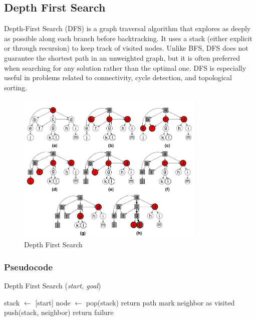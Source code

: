 \subsection{Depth First Search}
\noindent Depth-First Search (DFS) is a graph traversal algorithm that explores as deeply as possible along each branch before backtracking. It uses a stack (either explicit or through recursion) to keep track of visited nodes. Unlike BFS, DFS does not guarantee the shortest path in an unweighted graph, but it is often preferred when searching for any solution rather than the optimal one. DFS is especially useful in problems related to connectivity, cycle detection, and topological sorting.

\begin{figure}[H]
	\centering
	\includegraphics[width=0.8\textwidth]{./imgs/dfs.png}
	\caption{Depth First Search}
\end{figure}

\subsubsection{Pseudocode}
\begin{algorithm}[H]
	\caption{Depth First Search (\textit{start, goal})}\label{alg:dfs}
	\begin{algorithmic}[1]
		\State stack \(\gets\) [start]
		\State node \(\gets\) pop(stack)
		\State return path
		\EndIf
		\State mark neighbor as visited
		\State push(stack, neighbor)
		\EndIf
		\EndFor
		\EndWhile
		\State return failure
	\end{algorithmic}
\end{algorithm}

